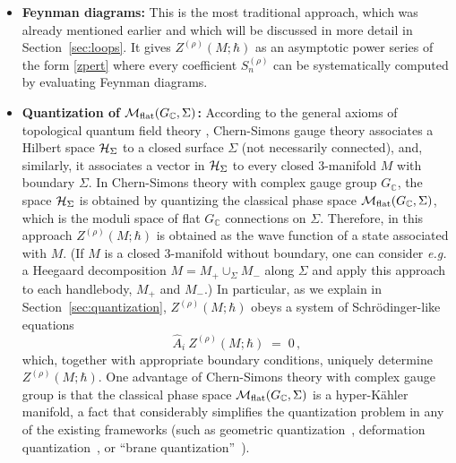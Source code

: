 \documentclass[hyper]{JHEP3}
\def\CH {{\cal H}}
\newcommand{\C}{{\mathbb{C}}}
\newcommand{\M}{{{\cal M}}_{{\rm flat}}}
\newcommand\be{\begin{equation}}
\newcommand\ee{\end{equation}}
\def\={\;=\;}
\begin{document}
\begin{itemize}

\item {\bf Feynman diagrams:}
This is the most traditional approach, which was already mentioned earlier
and which will be discussed in more detail in Section~\ref{sec:loops}.
It gives $Z^{(\rho)} (M;\hbar)$ as an asymptotic power series of the form \eqref{zpert}
where every coefficient $S_{n}^{(\rho)}$ can be systematically computed by evaluating Feynman diagrams.

\item {\bf Quantization of $\M (G_{\C}, \Sigma)$:}
According to the general axioms of topological quantum field theory \cite{atiyah-1990},
Chern-Simons gauge theory associates a Hilbert space $\CH_{\Sigma}$
to a closed surface $\Sigma$ (not necessarily connected),
and, similarly, it associates a vector in $\CH_{\Sigma}$
to every closed 3-manifold $M$ with boundary $\Sigma$.
In Chern-Simons theory with complex gauge group $G_{\C}$,
the space $\CH_{\Sigma}$ is obtained by quantizing the classical phase space
$\M (G_{\C}, \Sigma)$, which is the moduli space of flat $G_{\C}$ connections on $\Sigma$.
Therefore, in this approach $Z^{(\rho)} (M;\hbar)$
is obtained as the wave function of a state associated with $M$.
(If $M$ is a closed 3-manifold without boundary,
one can consider {\it e.g.} a Heegaard decomposition $M = M_+ \cup_{\Sigma} M_-$ along $\Sigma$
and apply this approach to each handlebody, $M_+$ and $M_-$.)
In particular, as we explain in Section~\ref{sec:quantization},
$Z^{(\rho)} (M;\hbar)$ obeys a system of Schr\"odinger-like equations
\be
\widehat{A}_i ~Z^{(\rho)} (M;\hbar) \= 0\,,
\label{aionz}
\ee
which, together with appropriate boundary conditions, uniquely determine $Z^{(\rho)} (M;\hbar)$.
One advantage of Chern-Simons theory with complex gauge group
is that the classical phase space $\M (G_{\C}, \Sigma)$
is a hyper-K\"ahler manifold, a fact that considerably simplifies
the quantization problem in any of the existing frameworks
(such as geometric quantization~\cite{woodhouse-1992},
deformation quantization~\cite{bayen-1978,kontsevich-2006},
or ``brane quantization''~\cite{gukov-2008}).


\end{itemize}
\end{document}
